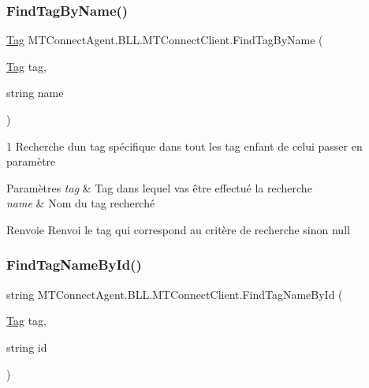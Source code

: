 \subsubsection{\texorpdfstring{Find\+Tag\+By\+Name()}{FindTagByName()}}
{\footnotesize\ttfamily \mbox{\hyperlink{class_m_t_connect_agent_1_1_model_1_1_tag}{Tag}} M\+T\+Connect\+Agent.\+B\+L\+L.\+M\+T\+Connect\+Client.\+Find\+Tag\+By\+Name (\begin{DoxyParamCaption}\item[{\mbox{\hyperlink{class_m_t_connect_agent_1_1_model_1_1_tag}{Tag}}}]{tag,  }\item[{string}]{name }\end{DoxyParamCaption})\hspace{0.3cm}{\ttfamily [inline]}}



1 Recherche d\textquotesingle{}un tag spécifique dans tout les tag enfant de celui passer en paramètre 


\begin{DoxyParams}{Paramètres}
{\em tag} & Tag dans lequel vas être effectué la recherche\\
\hline
{\em name} & Nom du tag recherché\\
\hline
\end{DoxyParams}
\begin{DoxyReturn}{Renvoie}
Renvoi le tag qui correspond au critère de recherche sinon null
\end{DoxyReturn}
\mbox{\label{class_m_t_connect_agent_1_1_b_l_l_1_1_m_t_connect_client_a785a56a144ad88ed9b8c3efbcc046fde}} 
\subsubsection{\texorpdfstring{Find\+Tag\+Name\+By\+Id()}{FindTagNameById()}}
{\footnotesize\ttfamily string M\+T\+Connect\+Agent.\+B\+L\+L.\+M\+T\+Connect\+Client.\+Find\+Tag\+Name\+By\+Id (\begin{DoxyParamCaption}\item[{\mbox{\hyperlink{class_m_t_connect_agent_1_1_model_1_1_tag}{Tag}}}]{tag,  }\item[{string}]{id }\end{DoxyParamCaption})\hspace{0.3cm}{\ttfamily [inline]}}




